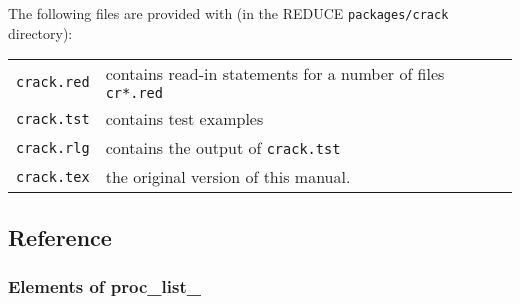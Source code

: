 The following files are provided with  (in the REDUCE
\texttt{packages/crack} directory):
\begin{flushleft}
  \begin{tabular}{ll}
    \texttt{crack.red} & contains read-in statements for a number
    of files \texttt{cr*.red} \\
    \texttt{crack.tst} & contains test examples \\
    \texttt{crack.rlg} & contains the output of \texttt{crack.tst} \\
    \texttt{crack.tex} & the original version of this manual.
  \end{tabular}
\end{flushleft}

\subsection{Reference}
\label{crack-lb1}

\subsubsection{Elements of proc\_list\_}

